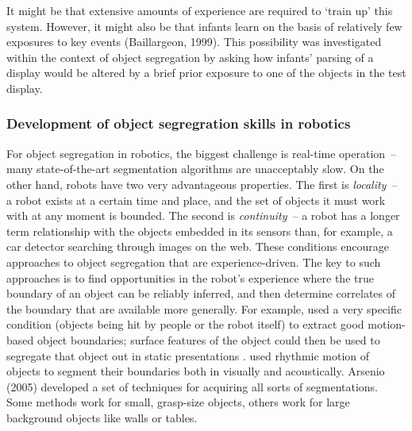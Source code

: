 It might be that extensive amounts of experience are required to
`train up' this system.  However, it might also be that infants learn
on the basis of relatively few exposures to key events (Baillargeon,
1999).  This possibility was investigated within the context of object
segregation by asking how infants' parsing of a display would be
altered by a brief prior exposure to one of the objects in the test
display.



\subsubsection*{Development of object segregration skills in robotics}

For object segregation in robotics, the biggest challenge is real-time
operation~-- many state-of-the-art segmentation algorithms are
unacceptably slow.  On the other hand, robots have two very
advantageous properties.  
%
The first is
{\em locality}~-- a robot exists at a certain time and place, and the
set of objects it must work with at any moment is bounded.  
%
The second is
{\em continuity}~-- a robot has a longer term relationship with
the objects embedded in its sensors than, for example, a car 
detector searching through images on the web.
%
These conditions encourage approaches to object segregation
that are experience-driven.
%
The key to such approaches is to find
opportunities in the robot's experience where the
true boundary of an object can be reliably inferred,
and then determine correlates of the boundary that 
are available more generally.
%
For example,  used
a very specific condition (objects being hit by
people or the robot itself) to extract good
motion-based object boundaries; surface features
of the object could then be used to segregate that
object out in static presentations \cite{fitzpatrick03object}.
 used rhythmic motion
of objects to segment their boundaries both in
visually and acoustically.
%
Arsenio (2005) developed a set of techniques for acquiring all
sorts of segmentations.  Some methods work for small, grasp-size
objects, others work for large background objects like walls or
tables.





